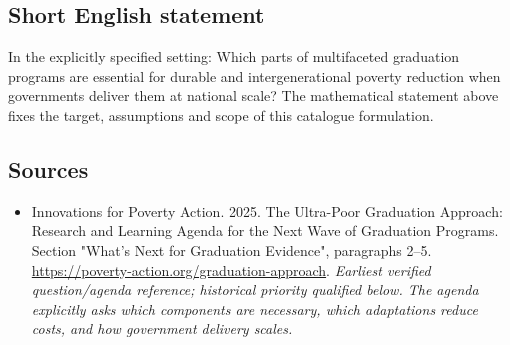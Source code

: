\documentclass[11pt]{article}
\begin{document}
\subsection{Short English statement}
In the explicitly specified setting: Which parts of multifaceted graduation programs are essential for durable and intergenerational poverty reduction when governments deliver them at national scale? The mathematical statement above fixes the target, assumptions and scope of this catalogue formulation.

\subsection{Sources}
\begin{itemize}\raggedright
\item[\textnormal{[S1]}]\hypertarget{source:30007653:1}{} Innovations for Poverty Action. 2025. The Ultra-Poor Graduation Approach: Research and Learning Agenda for the Next Wave of Graduation Programs. Section "What’s Next for Graduation Evidence", paragraphs 2–5.
\url{https://poverty-action.org/graduation-approach}.
{\small\textit{Earliest verified question/agenda reference; historical priority qualified below. The agenda explicitly asks which components are necessary, which adaptations reduce costs, and how government delivery scales.}}
\end{itemize}
\end{document}
